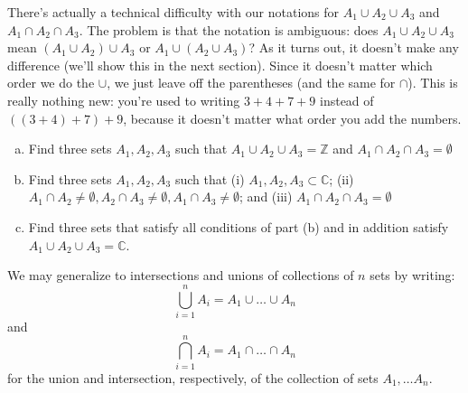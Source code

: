 \begin{rem}
There's actually a technical difficulty with our notations for  $A_{1} \cup A_2 \cup A_3$ and $A_{1} \cap A_2 \cap A_3$. The problem is that the notation is ambiguous: does $A_{1} \cup A_2 \cup A_3$ mean $(A_{1} \cup A_2) \cup A_3$ or $A_{1} \cup (A_2 \cup A_3)$? As it turns out, it doesn't make any difference (we'll show this in the next section). Since it doesn't matter which order we do the $\cup$, we just leave off the parentheses (and the same for $\cap$). This is really nothing new: you're used to writing $3 + 4 + 7 + 9$ instead of $((3+4)+7)+9$, because it doesn't matter what order you add the numbers.
\end{rem}

\begin{exercise}{12}
\begin{enumerate}[(a)]
\item
Find three sets $A_1, A_2, A_3$ such that $A_{1} \cup A_2 \cup A_3 = {\mathbb Z}$ and $A_{1} \cap A_2 \cap A_3 = \emptyset$
\item
Find three sets $A_1, A_2, A_3$ such that (i) $A_1, A_2, A_3 \subset {\mathbb C}$; (ii) $A_1 \cap A_2 \neq \emptyset, A_2 \cap A_3 \neq  \emptyset, A_1 \cap A_3 \neq \emptyset$; and (iii) $A_{1} \cap A_2 \cap A_3 = \emptyset$
\item
Find three sets that satisfy all conditions of part (b) and in addition satisfy $A_{1} \cup A_2 \cup A_3 = {\mathbb C}$.
\end{enumerate}
\end{exercise}

\noindent
We may generalize to intersections and unions of collections of $n$ sets by writing:
\[
\bigcup_{i = 1}^{n} A_{i} = A_{1} \cup \ldots \cup A_n
\]
and
\[
\bigcap_{i = 1}^{n} A_{i} = A_{1} \cap \ldots \cap A_n
\]
for the union and intersection, respectively, of the collection of sets $A_1, \ldots A_n$.



